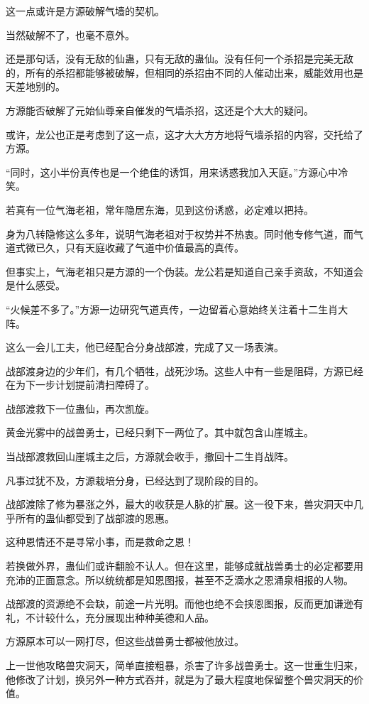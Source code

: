 \begin{this_body}
这一点或许是方源破解气墙的契机。

当然破解不了，也毫不意外。

还是那句话，没有无敌的仙蛊，只有无敌的蛊仙。没有任何一个杀招是完美无敌的，所有的杀招都能够被破解，但相同的杀招由不同的人催动出来，威能效用也是天差地别的。

方源能否破解了元始仙尊亲自催发的气墙杀招，这还是个大大的疑问。

或许，龙公也正是考虑到了这一点，这才大大方方地将气墙杀招的内容，交托给了方源。

“同时，这小半份真传也是一个绝佳的诱饵，用来诱惑我加入天庭。”方源心中冷笑。

若真有一位气海老祖，常年隐居东海，见到这份诱惑，必定难以把持。

身为八转隐修这么多年，说明气海老祖对于权势并不热衷。同时他专修气道，而气道式微已久，只有天庭收藏了气道中价值最高的真传。

但事实上，气海老祖只是方源的一个伪装。龙公若是知道自己亲手资敌，不知道会是什么感受。

“火候差不多了。”方源一边研究气道真传，一边留着心意始终关注着十二生肖大阵。

这么一会儿工夫，他已经配合分身战部渡，完成了又一场表演。

战部渡身边的少年们，有几个牺牲，战死沙场。这些人中有一些是阻碍，方源已经在为下一步计划提前清扫障碍了。

战部渡救下一位蛊仙，再次凯旋。

黄金光雾中的战兽勇士，已经只剩下一两位了。其中就包含山崖城主。

当战部渡救回山崖城主之后，方源就会收手，撤回十二生肖战阵。

凡事过犹不及，方源栽培分身，已经达到了现阶段的目的。

战部渡除了修为暴涨之外，最大的收获是人脉的扩展。这一役下来，兽灾洞天中几乎所有的蛊仙都受到了战部渡的恩惠。

这种恩情还不是寻常小事，而是救命之恩！

若换做外界，蛊仙们或许翻脸不认人。但在这里，能够成就战兽勇士的必定都要用充沛的正面意念。所以统统都是知恩图报，甚至不乏滴水之恩涌泉相报的人物。

战部渡的资源绝不会缺，前途一片光明。而他也绝不会挟恩图报，反而更加谦逊有礼，不计较什么，充分展现出种种美德和人品。

方源原本可以一网打尽，但这些战兽勇士都被他放过。

上一世他攻略兽灾洞天，简单直接粗暴，杀害了许多战兽勇士。这一世重生归来，他修改了计划，换另外一种方式吞并，就是为了最大程度地保留整个兽灾洞天的价值。


\end{this_body}
